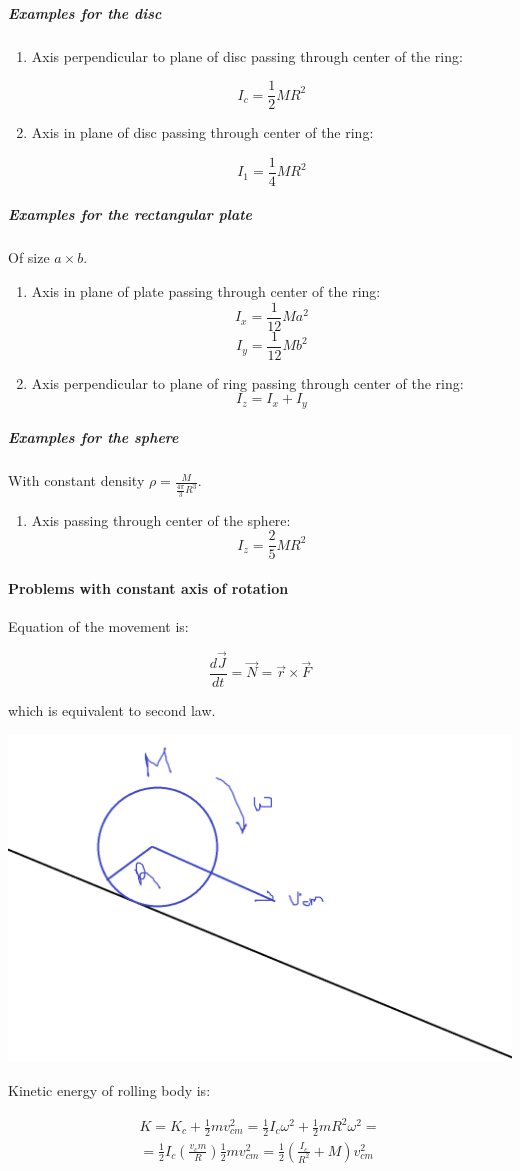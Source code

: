 \subparagraph{Examples for the disc}

\begin{enumerate}
	\item Axis perpendicular to plane of disc passing through center of the ring:
	
	$$I_c = \frac{1}{2}MR^2$$
	\item Axis in plane of disc passing through center of the ring:
	
	$$I_1 = \frac{1}{4}MR^2$$
\end{enumerate}

\subparagraph{Examples for the rectangular plate}
Of size $a\times b$.
\begin{enumerate}
	\item Axis in plane of plate passing through center of the ring:
	$$I_x = \frac{1}{12}Ma^2$$
	$$I_y = \frac{1}{12}Mb^2$$
	
	\item Axis perpendicular to plane of ring passing through center of the ring:
	$$I_z = I_x + I_y$$
\end{enumerate}


\subparagraph{Examples for the sphere}
With constant density $\rho = \frac{M}{\frac{4\pi}{3}R^3}$.
\begin{enumerate}
	\item Axis passing through center of the sphere:
	$$I_z = \frac{2}{5}MR^2$$
\end{enumerate}

\paragraph{Problems with constant axis of rotation}
Equation of the movement is:

$$\frac{d\vec{J}}{dt}= \vec{N} = \vec{r} \times \vec{F}$$

which is equivalent to second law.

\begin{center}
	\includegraphics[width=0.9\linewidth]{./lect17/pic2.png}
\end{center}

Kinetic energy of rolling body is:

\begin{align*}
K = K_c + \frac{1}{2}mv^2_{cm} = \frac{1}{2} I_c \omega^2 + \frac{1}{2} m R^2 \omega^2 =\\= \frac{1}{2}I_c \left( \frac{v_cm}{R} \right) \frac{1}{2}mv_{cm}^2 = \frac{1}{2}\left( \frac{I_c}{R^2} + M \right)v_{cm}^2
\end{align*}
